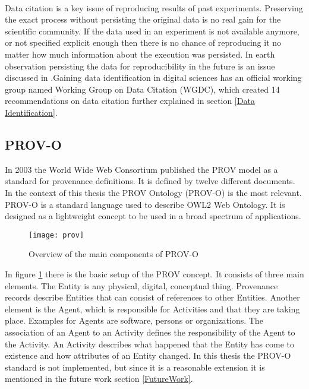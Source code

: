 \documentclass[draft,final]{vutinfth} %
\begin{document}
\\
Data citation is a key issue of reproducing results of past experiments. Preserving the exact process without persisting the original data is no real gain for the scientific community. If the data used in an experiment is not available anymore, or not specified explicit enough then there is no chance of reproducing it no matter how much information about the execution was persisted. In earth observation persisting the data for reproducibility in the future is an issue discussed in \cite{6352411}.Gaining data identification in digital sciences has an official working group named Working Group on Data Citation (WGDC), which created 14 recommendations on data citation further explained in section \ref{Data Identification}.
 \subsection{PROV-O}\label{PROV}
In 2003 the World Wide Web Consortium published the PROV model as a standard for provenance definitions. It is defined by twelve different documents. In the context of this thesis the PROV Ontology (PROV-O) is the most relevant. \cite{f06eee9045b445be89cf07100b3ce05c}
PROV-O is a standard language used to describe OWL2 Web Ontology. It is designed as a lightweight concept to be used in a broad spectrum of applications. 

\begin{figure}[h]
	\centering
	\texttt{[image: prov]}
	\caption{Overview of the main components of PROV-O \cite{733f89c65e4844f9aabcae1c276a5602}}
	\label{fig:prov} %
\end{figure}

In figure \ref{fig:prov} there is the basic setup of the PROV concept. It consists of three main elements. The Entity is any physical, digital, conceptual thing. Provenance records describe Entities that can consist of references to other Entities. Another element is the Agent, which is responsible for Activities and that they are taking place. Examples for Agents are software, persons or organizations. The association of an Agent to an Activity defines the responsibility of the Agent to the Activity. An Activity describes what happened that the Entity has come to existence and how attributes of an Entity changed.\cite{f06eee9045b445be89cf07100b3ce05c} In this thesis the PROV-O standard is not implemented, but since it is a reasonable extension it is mentioned in the future work section \ref{FutureWork}.
\end{document}

